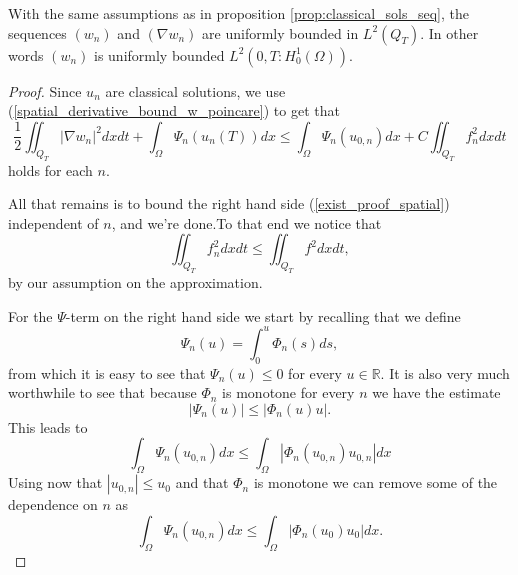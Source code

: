 \documentclass[11pt, a4paper]{article}
\begin{document}
\begin{proposition}
\label{prop:spatial_boundedness}
With the same assumptions as in proposition \ref{prop:classical_sols_seq},
the sequences $(w_n)$ and $(\nabla w_n)$ are uniformly bounded in $L^2(Q_T)$. In other words $(w_n)$ is uniformly bounded $L^2(0,T: H^1_0(\Omega))$.
\end{proposition}
\begin{proof}
Since $u_n$ are classical solutions, we use (\ref{spatial_derivative_bound_w_poincare}) to get that
	\begin{equation}
	\label{exist_proof_spatial}
	\frac{1}{2}\iint_{Q_T}|\nabla w_n|^2 dxdt + \int_\Omega \Psi_n(u_n(T))dx  \leq \int_\Omega \Psi_n(u_{0,n})dx + C\iint_{Q_T}f_n^2 dxdt
	\end{equation}
	holds for each $n$.


	All that remains is to bound the right hand side (\ref{exist_proof_spatial}) independent of $n$, and we're done.To that end we notice that
	\begin{equation*}
	\iint_{Q_T}f_n^2dxdt \leq \iint_{Q_T} f^2 dxdt,
	\end{equation*}
	by our assumption on the approximation.
	
	For the $\Psi$-term on the right hand side we start by recalling that we define
	\begin{equation*}
	\Psi_n(u) = \int_0^{u}\Phi_n(s)ds,
	\end{equation*}
	from which it is easy to see that $\Psi_n(u) \leq 0$ for every $u \in \mathbb{R}$. It is also very much worthwhile to see that because $\Phi_n$ is monotone for every $n$ we have the estimate
	\begin{equation*}
	|\Psi_n(u)| \leq |\Phi_n(u)u|.
	\end{equation*}
	This leads to
	\begin{equation*}
	\int_\Omega \Psi_n(u_{0,n})dx \leq \int_\Omega |\Phi_n(u_{0,n})u_{0,n}|dx	
	\end{equation*}
	Using now that $|u_{0,n}| \leq u_0$ and that $\Phi_n$ is monotone we can remove some of the dependence on $n$ as
	\begin{equation*}
	\int_\Omega \Psi_n(u_{0,n})dx \leq \int_\Omega |\Phi_n(u_{0})u_{0}|dx.
	\end{equation*}
	

\end{proof}
\end{document}
